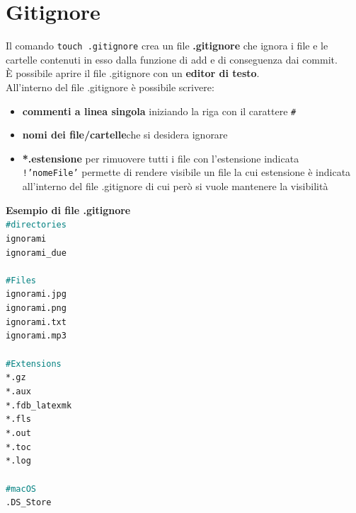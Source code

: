 \documentclass[12pt, a4paper]{article}
\begin{document}
\section{Gitignore}
Il comando \texttt{touch .gitignore} crea un file \textbf{.gitignore} che ignora i file e le cartelle contenuti in esso dalla funzione di add e di conseguenza dai commit.\\
È possibile aprire il file .gitignore con un \textbf{editor di testo}.\\
All’interno del file .gitignore è possibile scrivere:
\begin{itemize}
    \item \textbf{commenti a linea singola} iniziando la riga con il carattere \texttt{\#}
    \item \textbf{nomi dei file/cartelle}che si desidera ignorare
    \item \textbf{*.estensione} per rimuovere tutti i file con l’estensione indicata\\
    \texttt{!'nomeFile'} permette di rendere visibile un file la cui estensione è indicata all’interno del file .gitignore di cui però si vuole mantenere la visibilità
\end{itemize}

\vspace{2.5 cm}
\noindent
\vspace{0.8 cm}
\noindent
\textbf{Esempio di file .gitignore}\\
\texttt{\textcolor{teal}{\#directories}}\\
\texttt{ignorami}\\
\texttt{ignorami\_due}\\\\
\texttt{\textcolor{teal}{\#Files}}\\
\texttt{ignorami.jpg}\\
\texttt{ignorami.png}\\
\texttt{ignorami.txt}\\
\texttt{ignorami.mp3}\\\\
\texttt{\textcolor{teal}{\#Extensions}}\\
\texttt{*.gz}\\
\texttt{*.aux}\\
\texttt{*.fdb\_latexmk}\\
\texttt{*.fls}\\
\texttt{*.out}\\
\texttt{*.toc}\\
\texttt{*.log}\\\\
\texttt{\textcolor{teal}{\#macOS}}\\
\texttt{.DS\_Store}\\
\end{document}
